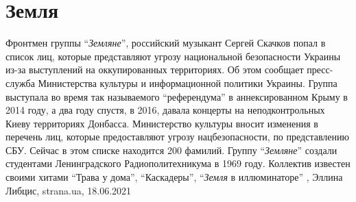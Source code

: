 
 
 
 
 
\chapter{Земля}
\label{sec:slova.zemlja}

Фронтмен группы \enquote{\emph{Земляне}}, российский музыкант Сергей Скачков
попал в список лиц, которые представляют угрозу национальной безопасности
Украины из-за выступлений на оккупированных территориях.  Об этом сообщает
пресс-служба Министерства культуры и информационной политики Украины.  Группа
выступала во время так называемого \enquote{референдума} в аннексированном
Крыму в 2014 году, а два году спустя, в 2016, давала концерты на
неподконтрольных Киеву территориях Донбасса.  Министерство культуры вносит
изменения в перечень лиц, которые предоставляют угрозу нацбезопасности, по
представлению СБУ. Сейчас в этом списке находится 200 фамилий.  Группу
\enquote{\emph{Земляне}} создали студентами Ленинградского Радиополитехникума в
1969 году. Коллектив известен своими хитами \enquote{Трава у дома},
\enquote{Каскадеры}, \enquote{\emph{Земля} в иллюминаторе}
, 
Эллина Либцис, strana.ua, 18.06.2021

